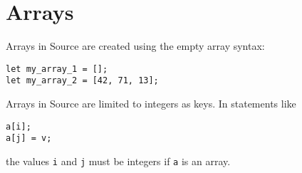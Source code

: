 \section*{Arrays}

Arrays in Source are created using the empty array syntax:
\begin{lstlisting}
let my_array_1 = [];
let my_array_2 = [42, 71, 13];
\end{lstlisting}
Arrays in Source are limited to integers as keys.
In statements like
\begin{lstlisting}
a[i];
a[j] = v;
\end{lstlisting}
the values \lstinline{i} and \lstinline{j} must be integers if \lstinline{a} is an array.

